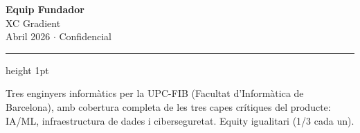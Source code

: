 \documentclass[11pt,a4paper]{article}
\begin{document}
\begin{center}
{\Huge\bfseries\color{dark} Equip Fundador}\\[0.3em]
{\Large\color{accent} XC Gradient}\\[0.5em]
{\small\color{midgray} Abril 2026 $\cdot$ Confidencial}
\end{center}

\vspace{0.5em}
{\color{accent}\hrule height 1pt}
\vspace{0.5em}

\begin{center}
\colorbox{softgreen}{\parbox{0.85\textwidth}{\centering\small
Tres enginyers informàtics per la UPC-FIB (Facultat d'Informàtica de Barcelona), amb cobertura completa de les tres capes crítiques del producte: IA/ML, infraestructura de dades i ciberseguretat. Equity igualitari (1/3 cada un).
}}
\end{center}

\vspace{1em}

\end{document}
